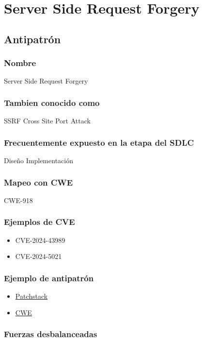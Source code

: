 \chapter{Server Side Request Forgery}
\section{Antipatrón}
\subsection*{Nombre}
Server Side Request Forgery
\subsection*{Tambien conocido como}
SSRF
Cross Site Port Attack
\subsection*{Frecuentemente expuesto en la etapa del SDLC}
Diseño
Implementación
\subsection*{Mapeo con CWE}
CWE-918
\subsection*{Ejemplos de CVE}
\begin{itemize}
    \item CVE-2024-43989
    \item CVE-2024-5021
\end{itemize}
\subsection*{Ejemplo de antipatrón}

\begin{itemize}
    \item \href{https://patchstack.com/academy/wordpress/vulnerabilities/server-side-request-forgery/}{Patchstack}
    \item \href{https://cwe.mitre.org/data/definitions/918.html}{CWE}
\end{itemize}

\subsection*{Fuerzas desbalanceadas}

